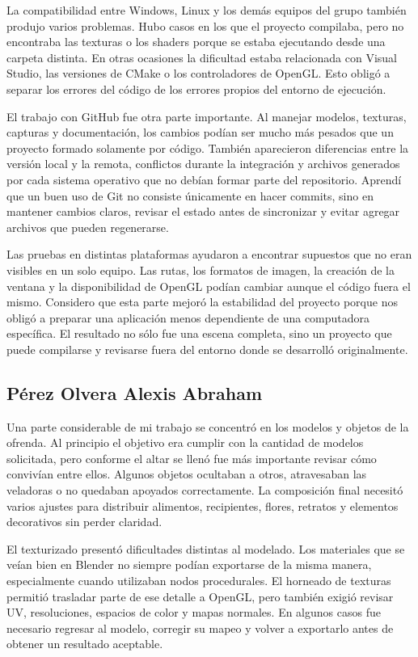 \documentclass[letter,12pt]{article}
\begin{document}
La compatibilidad entre Windows, Linux y los demás equipos del grupo también produjo varios problemas. Hubo casos en los que el proyecto compilaba, pero no encontraba las texturas o los shaders porque se estaba ejecutando desde una carpeta distinta. En otras ocasiones la dificultad estaba relacionada con Visual Studio, las versiones de CMake o los controladores de OpenGL. Esto obligó a separar los errores del código de los errores propios del entorno de ejecución.

El trabajo con GitHub fue otra parte importante. Al manejar modelos, texturas, capturas y documentación, los cambios podían ser mucho más pesados que un proyecto formado solamente por código. También aparecieron diferencias entre la versión local y la remota, conflictos durante la integración y archivos generados por cada sistema operativo que no debían formar parte del repositorio. Aprendí que un buen uso de Git no consiste únicamente en hacer commits, sino en mantener cambios claros, revisar el estado antes de sincronizar y evitar agregar archivos que pueden regenerarse.

Las pruebas en distintas plataformas ayudaron a encontrar supuestos que no eran visibles en un solo equipo. Las rutas, los formatos de imagen, la creación de la ventana y la disponibilidad de OpenGL podían cambiar aunque el código fuera el mismo. Considero que esta parte mejoró la estabilidad del proyecto porque nos obligó a preparar una aplicación menos dependiente de una computadora específica. El resultado no sólo fue una escena completa, sino un proyecto que puede compilarse y revisarse fuera del entorno donde se desarrolló originalmente.

\subsection*{Pérez Olvera Alexis Abraham}

Una parte considerable de mi trabajo se concentró en los modelos y objetos de la ofrenda. Al principio el objetivo era cumplir con la cantidad de modelos solicitada, pero conforme el altar se llenó fue más importante revisar cómo convivían entre ellos. Algunos objetos ocultaban a otros, atravesaban las veladoras o no quedaban apoyados correctamente. La composición final necesitó varios ajustes para distribuir alimentos, recipientes, flores, retratos y elementos decorativos sin perder claridad.

El texturizado presentó dificultades distintas al modelado. Los materiales que se veían bien en Blender no siempre podían exportarse de la misma manera, especialmente cuando utilizaban nodos procedurales. El horneado de texturas permitió trasladar parte de ese detalle a OpenGL, pero también exigió revisar UV, resoluciones, espacios de color y mapas normales. En algunos casos fue necesario regresar al modelo, corregir su mapeo y volver a exportarlo antes de obtener un resultado aceptable.
\end{document}
